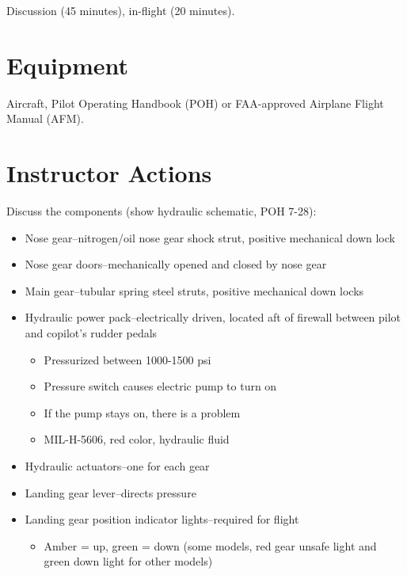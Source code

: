 \documentclass[twoside,openright]{report}
\begin{document}
Discussion (45 minutes), in-flight (20 minutes).

\section{Equipment}

Aircraft, Pilot Operating Handbook (POH) or FAA-approved Airplane Flight Manual (AFM).

\section{Instructor Actions}

Discuss the components (show hydraulic schematic, POH 7-28):
\begin{itemize}
  \item Nose gear--nitrogen/oil nose gear shock strut, positive mechanical down
    lock

  \item Nose gear doors--mechanically opened and closed by nose gear

  \item Main gear--tubular spring steel struts, positive mechanical down locks

  \item Hydraulic power pack--electrically driven, located aft of firewall
    between pilot and copilot's rudder pedals
    \begin{itemize}
      \item Pressurized between 1000-1500 psi
      \item Pressure switch causes electric pump to turn on
      \item If the pump stays on, there is a problem
      \item MIL-H-5606, red color, hydraulic fluid
    \end{itemize}

  \item Hydraulic actuators--one for each gear

  \item Landing gear lever--directs pressure

  \item Landing gear position indicator lights--required for flight

    \begin{itemize}
      \item Amber = up, green = down (some models, red gear unsafe light and
        green down light for other models)


\end{itemize}
\end{itemize}
\end{document}
